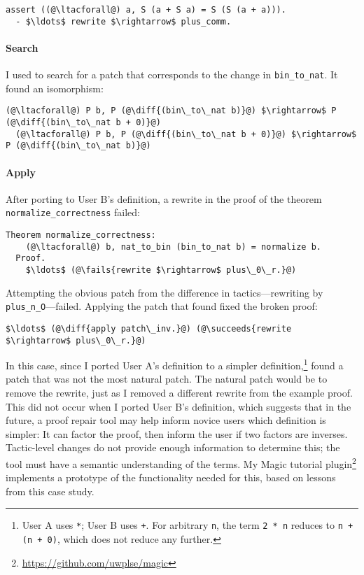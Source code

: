 \begin{lstlisting}[language=coq]
  assert ((@\ltacforall@) a, S (a + S a) = S (S (a + a))).
  - $\ldots$ rewrite $\rightarrow$ plus_comm.
\end{lstlisting} %

\paragraph{Search} I used \sysname to search for a patch that corresponds to the change in \lstinline{bin_to_nat}.
It found an isomorphism:

\begin{lstlisting}[language=coq]
  (@\ltacforall@) P b, P (@\diff{(bin\_to\_nat b)}@) $\rightarrow$ P (@\diff{(bin\_to\_nat b + 0)}@)
  (@\ltacforall@) P b, P (@\diff{(bin\_to\_nat b + 0)}@) $\rightarrow$ P (@\diff{(bin\_to\_nat b)}@)
\end{lstlisting}

\paragraph{Apply} After porting to User B's definition, a rewrite in the proof of the theorem
\lstinline{normalize_correctness} failed:

\begin{lstlisting}[language=coq]
  Theorem normalize_correctness:
    (@\ltacforall@) b, nat_to_bin (bin_to_nat b) = normalize b.
  Proof.
    $\ldots$ (@\fails{rewrite $\rightarrow$ plus\_0\_r.}@)
\end{lstlisting}
Attempting the obvious patch from the difference in tactics---rewriting by \lstinline{plus_n_O}---failed.
Applying the patch that \sysname found fixed the broken proof:

\begin{lstlisting}[language=coq]
   $\ldots$ (@\diff{apply patch\_inv.}@) (@\succeeds{rewrite $\rightarrow$ plus\_0\_r.}@)
\end{lstlisting}

In this case, since I ported User A's definition to a simpler 
definition,\footnote{User A uses \lstinline{*}; User B uses \lstinline{+}. 
For arbitrary \lstinline{n}, the term \lstinline{2 * n} reduces to \lstinline{n + (n + 0)}, which does not reduce any further.}
\sysname found a patch that was not the most natural patch.
The natural patch would be to remove the rewrite, just as I removed a different rewrite from the example proof.
This did not occur when I ported User B's definition,
which suggests that in the future, a proof repair tool may help inform novice users which definition is simpler:
It can factor the proof,  
then inform the user if two factors are inverses.
Tactic-level changes do not provide enough information to determine this; the tool must have a semantic
understanding of the terms.
My Magic tutorial plugin\footnote{\url{https://github.com/uwplse/magic}} %
implements a prototype of the functionality needed for this, based on lessons from this case study.

